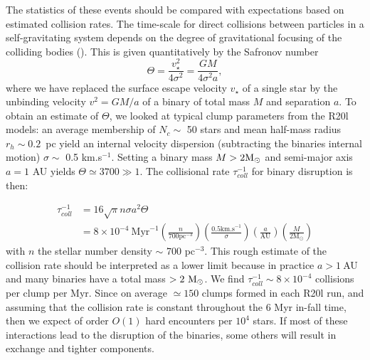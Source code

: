 The statistics of these events should be compared with expectations based on estimated collision rates. 
The  time-scale for direct collisions between  particles in a self-gravitating system  depends on the degree of gravitational focusing of the colliding bodies  (\citealt[section 7.5.8, Eq. 7.195a]{BT}). This is given quantitatively by the Safronov number
\begin{equation}
\Theta =  \frac{v_\star^2}{4\sigma^2} = \frac{G M }{ 4\sigma^2 a },
\end{equation}
 where we have replaced the surface escape velocity $v_\star$ of a single star by the 
unbinding velocity $v^2 = GM/a$ of a binary of total mass $M$ and separation $a$. To obtain an estimate of $\Theta$, we looked at typical clump parameters from the R20l models: an average membership of $N_c \sim$ 50 stars and mean half-mass radius $r_{h}\sim 0.2$~pc yield  an internal velocity dispersion (subtracting the binaries internal motion) $\sigma \sim$ 0.5 km.s$^{-1}$. Setting a binary mass $ M > 2 {\textrm{M}_\odot}$ and semi-major axis $ a = 1 $ AU yields $\Theta \simeq 3 700 \gg 1$. The collisional rate $\tau_{coll}^{-1}$  for binary disruption is then: 

\begin{align}
\label{Eq:6_collrate}
\tau_{coll}^{-1} &= 16 \sqrt{\pi} n \sigma a^2 \Theta \nonumber\\
			&= 8\times 10^{-4}~ \textrm{Myr}^{-1} \left(\frac{n}{700 \textrm{pc}^{-3}}\right) \left(\frac{0.5 \textrm{km.s}^{-1}}{\sigma}\right) \left(\frac{a}{\textrm{AU}}\right) \left(\frac{M}{2 \textrm{M}_\odot}\right)
\end{align}
with $n$ the stellar number density  $\sim$ 700 pc$^{-3}$. 
This rough estimate of the collision rate should be interpreted as a lower limit because in practice $a > 1 ~$AU and many binaries have a total mass $> 2~{\textrm{M}_\odot}$. We find  $\tau_{coll}^{-1} \sim 8\times 10^{-4}$ collisions per clump per Myr. Since on average $\simeq 150$ clumps formed in each R20l run, and assuming that the collision rate is 
constant throughout the 6 Myr  in-fall time, then we expect of order $O(1) $  hard  encounters  per $10^4$ stars. If most of these interactions lead to  the disruption of the binaries, some others  will result in exchange and tighter components. 

